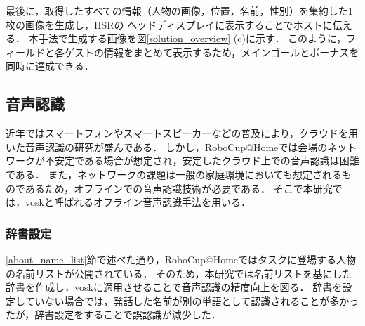 \documentclass[a4j]{jarticle}
\begin{document}
最後に，取得したすべての情報（人物の画像，位置，名前，性別）を集約した1枚の画像を生成し，HSRの
ヘッドディスプレイに表示することでホストに伝える．
本手法で生成する画像を図\ref{solution_overview} (c)に示す．
このように，フィールドと各ゲストの情報をまとめて表示するため，メインゴールとボーナスを同時に達成できる．


\subsection{音声認識}
近年ではスマートフォンやスマートスピーカーなどの普及により，クラウドを用いた音声認識の研究が盛んである\cite{google_speech_api, amazon_speech_api}．
しかし，RoboCup@Homeでは会場のネットワークが不安定である場合が想定され，安定したクラウド上での音声認識は困難である．
また，ネットワークの課題は一般の家庭環境においても想定されるものであるため，オフラインでの音声認識技術が必要である．
そこで本研究では，vosk\cite{vosk_hp}と呼ばれるオフライン音声認識手法を用いる．


\subsubsection{辞書設定}
\ref{about_name_list}節で述べた通り，RoboCup@Homeではタスクに登場する人物の名前リストが公開されている．
そのため，本研究では名前リストを基にした辞書を作成し，voskに適用させることで音声認識の精度向上を図る．
辞書を設定していない場合では，発話した名前が別の単語として認識されることが多かったが，辞書設定をすることで誤認識が減少した．
\end{document}
